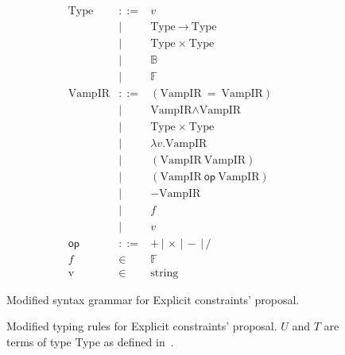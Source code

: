 \documentclass[
    9pt,            
    techreport,       
    affiltop,       
]{art}
\begin{document}
\begin{figure}[!htb]
\begin{equation*}
\begin{array}{rclr}
    \text{Type} &::= &v &\\
    &| &\text{Type} \ \xrightarrow{} \ \text{Type}  & \\
    &| &\text{Type} \ \times \ \text{Type}  & \\
    &| &\mathbb{B}  & \\
    &| &\mathbb{F}  & \\[4mm]
    \text{VampIR} &::=  &(\text{VampIR} \ = \ \text{VampIR}) &\\
    &|   &\text{VampIR} \wedge \text{VampIR} &\\
    &|   &\text{Type} \ \times \ \text{Type} &\\
    &|   &\lambda v . \text{VampIR} &\\
    &|   &(\text{VampIR}\ \text{VampIR}) &\\
    &|   &(\text{VampIR} \ \textsf{op} \ \text{VampIR}) &\\
    &|  &- \text{VampIR} &\\
    &|  &f  & \\
    &|  &v &\\[2mm]
    \textsf{op} &::=  &+ \,|\, \times \,|\, - \,|\, / &\\
    f &\in  &\mathbb{F} &\\
    \text{v} &\in  &\text{string} &
\end{array}
\end{equation*}
\caption{Modified \VampIR{} syntax grammar for Explicit constraints' proposal.}
\label{fig:modified-grammar}
\end{figure}


\begin{figure}[!htb]
\centering
\begin{spacing}{1.5}
\end{spacing}
\caption{Modified \VampIR{} typing rules for Explicit constraints' proposal. $U$ and $T$ are terms of type \textsf{Type} as defined in~.}
\label{fig:modified-typing-rules}
\end{figure}
\end{document}
